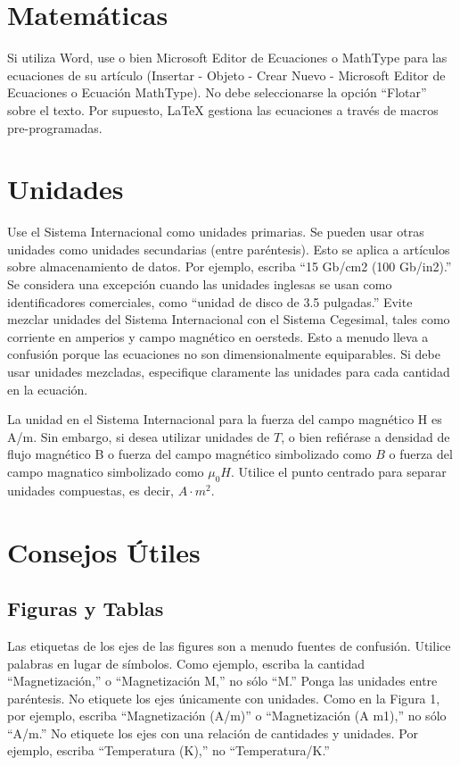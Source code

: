 \documentclass[final,5p,times,twocolumn,authoryear,10pt]{elsarticle}
\begin{document}
\section{Matemáticas}
Si utiliza Word, use o bien Microsoft Editor de Ecuaciones o  MathType  para las ecuaciones de su artículo (Insertar - Objeto - Crear Nuevo - Microsoft Editor de Ecuaciones o Ecuación MathType). No debe seleccionarse la opción “Flotar” sobre el texto. Por supuesto, LaTeX gestiona las ecuaciones a través de macros pre-programadas.

\section{Unidades}

Use el Sistema Internacional como unidades primarias. Se pueden usar otras unidades como unidades secundarias (entre paréntesis). Esto se aplica a artículos sobre almacenamiento de datos. Por ejemplo, escriba “15 Gb/cm2 (100 Gb/in2).” Se considera una excepción cuando las unidades inglesas se usan como identificadores comerciales, como “unidad de disco de 3.5 pulgadas.” Evite mezclar unidades del Sistema Internacional con el Sistema Cegesimal, tales como corriente en amperios y campo magnético en  oersteds. Esto a menudo lleva a confusión porque las ecuaciones no son dimensionalmente equiparables. Si debe usar unidades mezcladas, especifique claramente las unidades para cada cantidad  en la ecuación.

La unidad en el Sistema Internacional para la fuerza del campo magnético H es A/m. Sin embargo, si desea utilizar unidades de $T$, o bien refiérase a densidad de flujo magnético B o fuerza del campo magnético simbolizado como $B$ o fuerza del campo magnatico simbolizado como $\mu_0 H$. Utilice el punto centrado para separar unidades compuestas, es decir, $A\cdot m^2$.

\section{Consejos Útiles}
\subsection{Figuras y Tablas}
Las etiquetas de los ejes de las figures son a menudo fuentes de confusión. Utilice palabras en lugar de símbolos. Como ejemplo, escriba la cantidad “Magnetización,” o “Magnetización M,” no sólo “M.” Ponga las unidades entre paréntesis. No etiquete los ejes únicamente con unidades. Como en la Figura 1, por ejemplo, escriba “Magnetización (A/m)” o “Magnetización (A m1),” no sólo “A/m.” No etiquete los ejes con una relación de cantidades y unidades. Por ejemplo, escriba “Temperatura (K),” no “Temperatura/K.”
\end{document}
